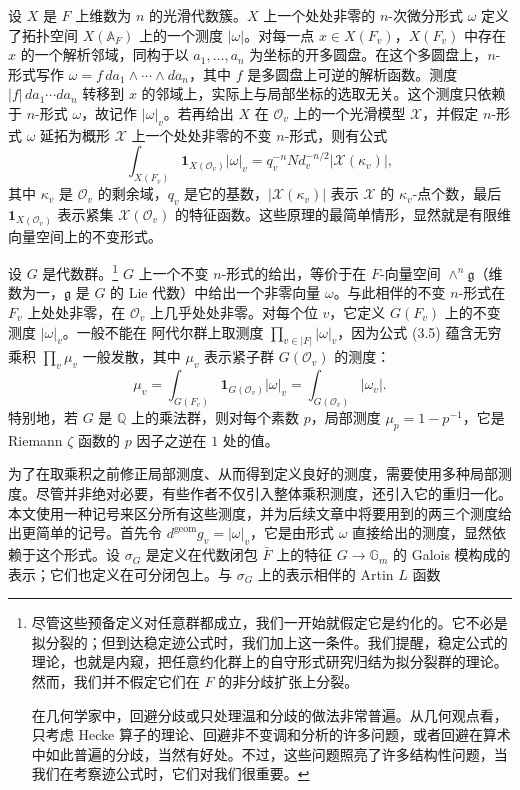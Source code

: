设 $X$ 是 $F$ 上维数为 $n$ 的光滑代数簇。$X$ 上一个处处非零的 $n$-次微分形式 $\omega$ 定义了拓扑空间 $X(\mathbb A_F)$ 上的一个测度 $|\omega|$。对每一点 $x\in X(F_v)$，$X(F_v)$ 中存在 $x$ 的一个解析邻域，同构于以 $a_1,\dots,a_n$ 为坐标的开多圆盘。在这个多圆盘上，$n$-形式写作 $\omega=f\,da_1\wedge\cdots\wedge da_n$，其中 $f$ 是多圆盘上可逆的解析函数。测度 $|f|\,da_1\cdots da_n$ 转移到 $x$ 的邻域上，实际上与局部坐标的选取无关。这个测度只依赖于 $n$-形式 $\omega$，故记作 $|\omega|_v$。若再给出 $X$ 在 $\mathcal O_v$ 上的一个光滑模型 $\mathcal X$，并假定 $n$-形式 $\omega$ 延拓为概形 $\mathcal X$ 上一个处处非零的不变 $n$-形式，则有公式
\begin{equation}\tag{3.5}
\int_{X(F_v)}\mathbf 1_{X(\mathcal O_v)}|\omega|_v
=q_v^{-n}N d_v^{-n/2}|\mathcal X(\kappa_v)|,
\end{equation}
其中 $\kappa_v$ 是 $\mathcal O_v$ 的剩余域，$q_v$ 是它的基数，$|\mathcal X(\kappa_v)|$ 表示 $\mathcal X$ 的 $\kappa_v$-点个数，最后 $\mathbf 1_{X(\mathcal O_v)}$ 表示紧集 $\mathcal X(\mathcal O_v)$ 的特征函数。这些原理的最简单情形，显然就是有限维向量空间上的不变形式。

设 $G$ 是代数群。\footnote{尽管这些预备定义对任意群都成立，我们一开始就假定它是约化的。它不必是拟分裂的；但到达稳定迹公式时，我们加上这一条件。我们提醒，稳定公式的理论，也就是内窥，把任意约化群上的自守形式研究归结为拟分裂群的理论。然而，我们并不假定它们在 $F$ 的非分歧扩张上分裂。

在几何学家中，回避分歧或只处理温和分歧的做法非常普遍。从几何观点看，只考虑 Hecke 算子的理论、回避非不变调和分析的许多问题，或者回避在算术中如此普遍的分歧，当然有好处。不过，这些问题照亮了许多结构性问题，当我们在考察迹公式时，它们对我们很重要。} $G$ 上一个不变 $n$-形式的给出，等价于在 $F$-向量空间 $\wedge^n\mathfrak g$（维数为一，$\mathfrak g$ 是 $G$ 的 Lie 代数）中给出一个非零向量 $\omega$。与此相伴的不变 $n$-形式在 $F_v$ 上处处非零，在 $\mathcal O_v$ 上几乎处处非零。对每个位 $v$，它定义 $G(F_v)$ 上的不变测度 $|\omega|_v$。一般不能在 阿代尔群上取测度 $\prod_{v\in|F|}|\omega|_v$，因为公式 (3.5) 蕴含无穷乘积 $\prod_v\mu_v$ 一般发散，其中 $\mu_v$ 表示紧子群 $G(\mathcal O_v)$ 的测度：
\[
\mu_v=\int_{G(F_v)}\mathbf 1_{G(\mathcal O_v)}|\omega|_v=\int_{G(\mathcal O_v)}|\omega_v|.
\]
特别地，若 $G$ 是 $\mathbb Q$ 上的乘法群，则对每个素数 $p$，局部测度 $\mu_p=1-p^{-1}$，它是 Riemann $\zeta$ 函数的 $p$ 因子之逆在 $1$ 处的值。

为了在取乘积之前修正局部测度、从而得到定义良好的测度，需要使用多种局部测度。尽管并非绝对必要，有些作者不仅引入整体乘积测度，还引入它的重归一化。本文使用一种记号来区分所有这些测度，并为后续文章中将要用到的两三个测度给出更简单的记号。首先令 $d^{\mathrm{geom}}g_v=|\omega|_v$，它是由形式 $\omega$ 直接给出的测度，显然依赖于这个形式。设 $\sigma_G$ 是定义在代数闭包 $\bar F$ 上的特征 $G\to\mathbb G_m$ 的 Galois 模构成的表示；它们也定义在可分闭包上。与 $\sigma_G$ 上的表示相伴的 Artin $L$ 函数

